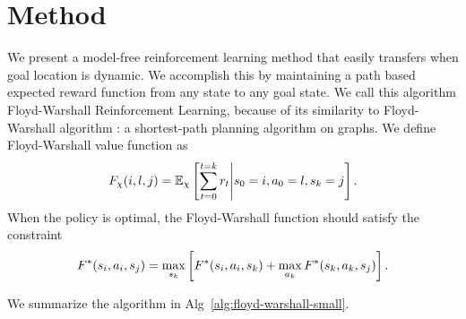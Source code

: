 \section{Method}
We present a model-free reinforcement learning method that easily transfers when goal
location is dynamic.
We accomplish this by maintaining a path based expected reward function from any state to any goal state.
We call this algorithm Floyd-Warshall Reinforcement Learning, because of its
similarity to Floyd-Warshall algorithm : a shortest-path planning algorithm on graphs.
We define Floyd-Warshall value function as
%
\begin{align}
F_{\chi}(i, l,  j) =
\mathbb{E}_{\chi}\left[ \sum_{t=0}^{t=k} r_t \middle\vert s_0 = i, a_0 = l, s_k = j \right] .
\end{align}%
%
When the policy is optimal, the Floyd-Warshall function should satisfy the constraint
%
\begin{align}
F^*(s_i, a_i, s_j) = \max_{s_k} \left[
F^*(s_i, a_i, s_k)
+ \max_{a_k}F^*(s_k, a_k, s_j) \right] .
\end{align}%
%

We summarize the algorithm in Alg~\ref{alg:floyd-warshall-small}.



